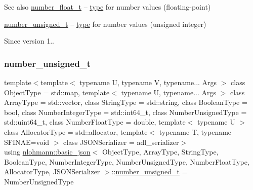 \begin{DoxySeeAlso}{See also}
\mbox{\hyperlink{classnlohmann_1_1basic__json_a88d6103cb3620410b35200ee8e313d97}{number\+\_\+float\+\_\+t}} -- \mbox{\hyperlink{classnlohmann_1_1basic__json_a2b2d781d7f2a4ee41bc0016e931cadf7}{type}} for number values (floating-\/point)

\mbox{\hyperlink{classnlohmann_1_1basic__json_ab906e29b5d83ac162e823ada2156b989}{number\+\_\+unsigned\+\_\+t}} -- \mbox{\hyperlink{classnlohmann_1_1basic__json_a2b2d781d7f2a4ee41bc0016e931cadf7}{type}} for number values (unsigned integer)
\end{DoxySeeAlso}
\begin{DoxySince}{Since}
version 1.. 
\end{DoxySince}
\mbox{\label{classnlohmann_1_1basic__json_ab906e29b5d83ac162e823ada2156b989}} 
\subsubsection{\texorpdfstring{number\_unsigned\_t}{number\_unsigned\_t}}
{\footnotesize\ttfamily template$<$template$<$ typename U, typename V, typename... Args $>$ class Object\+Type = std\+::map, template$<$ typename U, typename... Args $>$ class Array\+Type = std\+::vector, class String\+Type  = std\+::string, class Boolean\+Type  = bool, class Number\+Integer\+Type  = std\+::int64\+\_\+t, class Number\+Unsigned\+Type  = std\+::uint64\+\_\+t, class Number\+Float\+Type  = double, template$<$ typename U $>$ class Allocator\+Type = std\+::allocator, template$<$ typename T, typename S\+F\+I\+N\+A\+E=void $>$ class J\+S\+O\+N\+Serializer = adl\+\_\+serializer$>$ \\
using \mbox{\hyperlink{classnlohmann_1_1basic__json}{nlohmann\+::basic\+\_\+json}}$<$ Object\+Type, Array\+Type, String\+Type, Boolean\+Type, Number\+Integer\+Type, Number\+Unsigned\+Type, Number\+Float\+Type, Allocator\+Type, J\+S\+O\+N\+Serializer $>$\+::\mbox{\hyperlink{classnlohmann_1_1basic__json_ab906e29b5d83ac162e823ada2156b989}{number\+\_\+unsigned\+\_\+t}} =  Number\+Unsigned\+Type}



